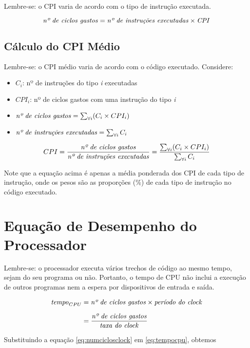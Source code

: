 \documentclass[12pt]{article}
\newcommand{\Text}[1]{\textrm{\textit{#1}}}
\begin{document}
Lembre-se: o CPI varia de acordo com o tipo de instrução executada.

\begin{equation} \label{eq:numciclosclock}
  \Text{nº de ciclos gastos} = \Text{nº de instruções executadas} \times \Text{CPI}
\end{equation}


\subsection{Cálculo do CPI Médio}

Lembre-se: o CPI médio varia de acordo com o código executado. Considere:
\begin{itemize}
  \item \( C_i \): nº de instruções do tipo \textit{i} executadas
  \item \( CPI_i \): nº de ciclos gastos com uma instrução do tipo \textit{i}
  \item \( \Text{nº de ciclos gastos} = \sum_{\forall i} (C_i \times CPI_i) \)
  \item \( \Text{nº de instruções executadas} = \sum_{\forall i} C_i \)
\end{itemize}

\[
  CPI = \frac{\Text{nº de ciclos gastos}}{\Text{nº de instruções executadas}}
  = \frac{\sum_{\forall i} (C_i \times CPI_i)}{\sum_{\forall i} C_i}
\]

Note que a equação acima é apenas a média ponderada dos CPI de cada tipo de instrução, onde os pesos são as proporções (\%) de cada tipo de instrução no código executado.


\section{Equação de Desempenho do Processador}


Lembre-se: o processador executa vários trechos de código ao mesmo tempo, sejam do seu programa ou não. Portanto, o tempo de CPU não inclui a execução de outros programas nem a espera por dispositivos de entrada e saída.

\begin{align} \label{eq:tempocpu}
  \Text{tempo}_{CPU} &= \Text{nº de ciclos gastos} \times \Text{período do clock} \\[\medskipamount]
  &= \frac{\Text{nº de ciclos gastos}}{\Text{taxa do clock}} \nonumber
\end{align}

Substituindo a equação \ref{eq:numciclosclock} em \ref{eq:tempocpu}, obtemos
\end{document}
